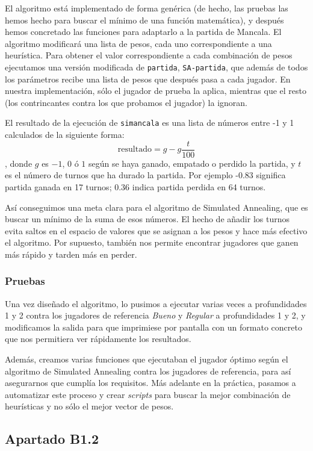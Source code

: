 \documentclass{apuntes}
\begin{document}
El algoritmo está implementado de forma genérica (de hecho, las pruebas las hemos hecho para buscar el mínimo de una función matemática), y después hemos concretado las funciones para adaptarlo a la partida de Mancala. El algoritmo modificará una lista de pesos, cada uno correspondiente a una heurística. Para obtener el valor correspondiente a cada combinación de pesos ejecutamos una versión modificada de \texttt{partida}, \texttt{SA-partida}, que además de todos los parámetros recibe una lista de pesos que después pasa a cada jugador. En nuestra implementación, sólo el jugador de prueba la aplica, mientras que el resto (los contrincantes contra los que probamos el jugador) la ignoran.

El resultado de la ejecución de  \texttt{simancala} es una lista de números entre -1 y 1 calculados de la siguiente forma: \[ \mathrm{resultado} = g - g \frac{t}{100} \], donde $g$ es $-1$, $0$ ó $1$ según se haya ganado, empatado o perdido la partida, y $t$ es el número de turnos que ha durado la partida. Por ejemplo -0.83 significa partida ganada en 17 turnos;  0.36 indica partida perdida en 64 turnos.

Así conseguimos una meta clara para el algoritmo de Simulated Annealing, que es buscar un mínimo de la suma de esos números. El hecho de añadir los turnos evita saltos en el espacio de valores que se asignan a los pesos y hace más efectivo el algoritmo. Por supuesto, también nos permite encontrar jugadores que ganen más rápido y tarden más en perder.

\subsubsection*{Pruebas}

Una vez diseñado el algoritmo, lo pusimos a ejecutar varias veces a profundidades 1 y 2 contra los jugadores de referencia \textit{Bueno} y \textit{Regular} a profundidades 1 y 2, y modificamos la salida para que imprimiese por pantalla con un formato concreto que nos permitiera ver rápidamente los resultados.

Además, creamos varias funciones que ejecutaban el jugador óptimo según el algoritmo de Simulated Annealing contra los jugadores de referencia, para así asegurarnos que cumplía los requisitos. Más adelante en la práctica, pasamos a automatizar este proceso y crear \textit{scripts} para buscar la mejor combinación de heurísticas y no sólo el mejor vector de pesos.

\subsection*{Apartado B1.2}
\end{document}
